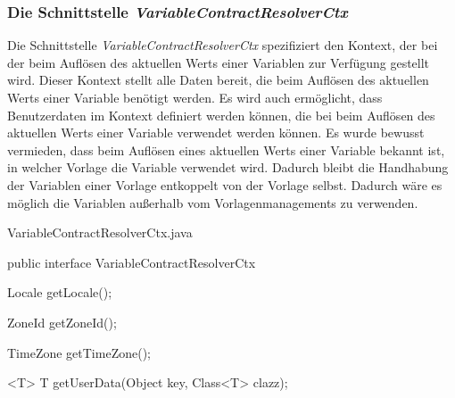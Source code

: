 \subsubsection{Die Schnittstelle \emph{VariableContractResolverCtx}}
\label{sec:variableResolverFactoryProvider}
Die Schnittstelle \emph{VariableContractResolverCtx} spezifiziert den Kontext, der bei der beim Auflösen des aktuellen Werts einer Variablen zur Verfügung gestellt wird. Dieser Kontext stellt alle Daten bereit, die beim Auflösen des aktuellen Werts einer Variable benötigt werden. Es wird auch ermöglicht, dass Benutzerdaten im Kontext definiert werden können, die bei beim Auflösen des aktuellen Werts einer Variable verwendet werden können. Es wurde bewusst vermieden, dass beim Auflösen eines aktuellen Werts einer Variable bekannt ist, in welcher Vorlage die Variable verwendet wird. Dadurch bleibt die Handhabung der Variablen einer Vorlage entkoppelt von der Vorlage selbst. Dadurch wäre es möglich die Variablen außerhalb vom Vorlagenmanagements zu verwenden.
\newpage

\begin{program}[h]
\caption{VariableContractResolverCtx.java}
\label{prog:variableContractResolverCtx}
\begin{JavaCode}
public interface VariableContractResolverCtx {

    Locale getLocale();

    ZoneId getZoneId();

    TimeZone getTimeZone();

    <T> T getUserData(Object key,
                      Class<T> clazz);
}
\end{JavaCode}
\end{program}

